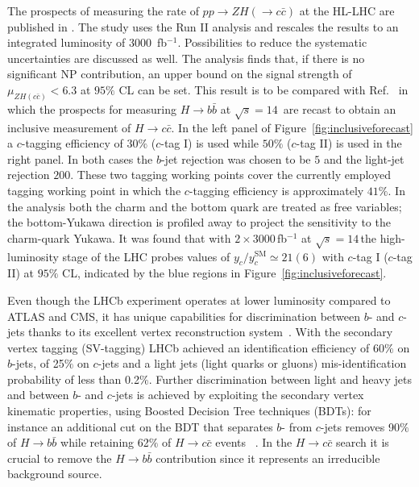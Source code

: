 \documentclass[../report.tex]{subfiles}
\begin{document}
The prospects of measuring 
the rate of $pp\to ZH(\to c\bar c)$ at the HL-LHC are published in  \cite{ATL-PHYS-PUB-2018-016}.
The study uses the Run II analysis \cite{Aaboud:2018fhh} and rescales the results 
to an integrated luminosity of $3000$~fb$^{-1}$.
Possibilities to reduce the systematic uncertainties are discussed as well.
The analysis finds that, if there is no significant NP contribution, 
an upper bound  on the signal strength 
 of $\mu_{ZH(c\bar c)} <6.3$ at $95\%$ CL can be set.
This result is to be compared with  Ref.~\cite{Perez:2015lra}
in which  the prospects for measuring $H\to b\bar b$ at $\sqrt{s}=14$\,\UTeV 
\cite{ATLAS-collaboration:2012iza} are recast 
 to obtain an inclusive measurement of $H\to c \bar c$.
In the left panel of Figure~\ref{fig:inclusiveforecast} a $c$-tagging efficiency of $30\%$ ($c$-tag I) is used while $50\%$ ($c$-tag II)  is used in the right panel. 
In both cases the $b$-jet rejection was chosen to be $5$ and the light-jet rejection
$200$.
These two tagging working points cover the currently employed tagging working point in which
the $c$-tagging efficiency is approximately $41\%$.
In the analysis both the charm and the bottom quark are treated as free variables;
the bottom-Yukawa direction is profiled away to project the sensitivity to the 
charm-quark Yukawa.
It was found that with $2\times 3000$\,fb$^{-1}$ at $\sqrt{s}=14$\,\UTeV the 
high-luminosity stage of the LHC probes values of $y_c/y_c^{\text{SM}}\simeq 21 (6)$ with
$c$-tag I ($c$-tag II)  at $95\%$ CL, indicated by the blue regions in Figure~\ref{fig:inclusiveforecast}.

Even though the LHCb experiment operates at lower luminosity  compared to ATLAS and CMS, it has unique capabilities for discrimination between $b$- and $c$-jets thanks to its excellent vertex reconstruction system~\cite{Aaij:2015yqa}. With the secondary vertex tagging (SV-tagging) LHCb achieved an identification efficiency of 60$\%$ on $b$-jets, of 25$\%$ on $c$-jets and a light jets (light quarks or gluons) mis-identification probability of less than 0.2$\%$. Further discrimination between light and heavy jets and between $b$- and $c$-jets is achieved by exploiting the secondary vertex kinematic properties, using Boosted Decision Tree techniques (BDTs): for instance an additional cut on the BDT that separates $b$- from $c$-jets removes 90$\%$ of $H\rightarrow b \bar{b}$ while retaining 62$\%$ of $H\rightarrow c \bar{c}$ events  ~\cite{LHCb:2016yxg}. In the $H\rightarrow c \bar{c}$ search it is crucial to remove the $H\rightarrow b \bar{b}$ contribution since it represents an irreducible background source.
\end{document}
